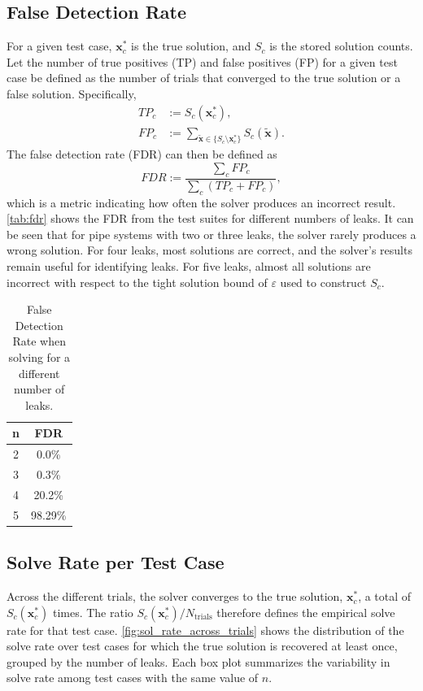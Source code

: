 \subsection{False Detection Rate}
For a given test case, $\mathbf{x}^*_c$ is the true solution, and $S_c$ is the stored solution counts. Let the number of true positives (TP) and false positives (FP) for a given test case be defined as the number of trials that converged to the true solution or a false solution. Specifically,
\begin{align*}
    TP_c &:= S_c(\mathbf{x}_c^*), \\
    FP_c &:= \sum_{\tilde{\mathbf{x}}\in \{S_c \setminus \mathbf{x}_c^*\} } S_c(\tilde{\mathbf{x}}).
\end{align*}
The false detection rate (FDR) can then be defined as
\begin{equation*}
    FDR:=\dfrac{\sum_{c} FP_c}{\sum_{c} (TP_c + FP_c)},
\end{equation*}
which is a metric indicating how often the solver produces an incorrect result.\\

\autoref{tab:fdr} shows the FDR from the test suites for different numbers of leaks. It can be seen that for pipe systems with two or three leaks, the solver rarely produces a wrong solution. For four leaks, most solutions are correct, and the solver's results remain useful for identifying leaks. For five leaks, almost all solutions are incorrect with respect to the tight solution bound of $\varepsilon$ used to construct $S_c$.

\begin{table}[ht]
\centering
\begin{tabular}{ c | c }
\hline
n & FDR \\
\hline
2 & 0.0\% \\
3 & 0.3\% \\
4 & 20.2\% \\
5 & 98.29\%\\
\hline
\end{tabular}
\caption{False Detection Rate when solving for a different number of leaks.}
\label{tab:fdr}
\end{table}

\subsection{Solve Rate per Test Case}

Across the different trials, the solver converges to the true solution, $\mathbf{x}_c^*$, a total of $S_c(\mathbf{x}_c^*)$ times. The ratio $S_c(\mathbf{x}_c^*)/N_{\text{trials}}$ therefore defines the empirical solve rate for that test case. \autoref{fig:sol_rate_across_trials} shows the distribution of the solve rate over test cases for which the true solution is recovered at least once, grouped by the number of leaks. Each box plot summarizes the variability in solve rate among test cases with the same value of $n$.\\


